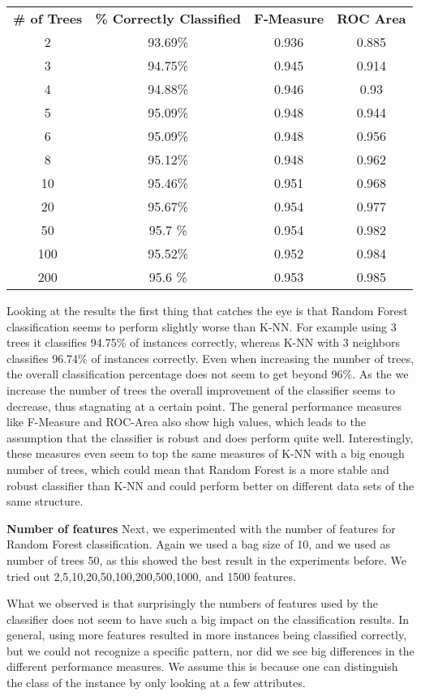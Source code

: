 \documentclass{sig-alternate-05-2015}
\begin{document}
{\begin{center}
\begin{tabular}{ c | c | c | c}
\textbf{\# of Trees} & \textbf{\% Correctly Classified} & \textbf{F-Measure} & \textbf{ROC Area}\\
2   & 93.69\% & 0.936 & 0.885\\
3   & 94.75\% & 0.945 & 0.914\\
4   & 94.88\% & 0.946 & 0.93\\
5   & 95.09\% & 0.948 & 0.944\\
6   & 95.09\% & 0.948 & 0.956\\
8   & 95.12\% & 0.948 & 0.962\\
10  & 95.46\% & 0.951 & 0.968\\
20  & 95.67\% & 0.954 & 0.977\\
50  & 95.7 \% & 0.954 & 0.982\\
100 & 95.52\% & 0.952 & 0.984\\
200 & 95.6 \% & 0.953 & 0.985\\
\end{tabular}
\end{center}

Looking at the results the first thing that catches the eye is that Random Forest classification seems to perform slightly worse than K-NN. For example using 3 trees it classifies 94.75\% of instances correctly, whereas K-NN with 3 neighbors classifies 96.74\% of instances correctly. Even when increasing the number of trees, the overall classification percentage does not seem to get beyond 96\%. As the we increase the number of trees the overall improvement of the classifier seems to decrease, thus stagnating at a certain point. The general performance measures like F-Measure and ROC-Area also show high values, which leads to the assumption that the classifier is robust and does perform quite well. Interestingly, these measures even seem to top the same measures of K-NN with a big enough number of trees, which could mean that Random Forest is a more stable and robust classifier than K-NN and could perform better on different data sets of the same structure.

\textbf{Number of features}
Next, we experimented with the number of features for Random Forest classification. Again we used a bag size of 10, and we used as number of trees 50, as this showed the best result in the experiments before. We tried out 2,5,10,20,50,100,200,500,1000, and 1500 features.

What we observed is that surprisingly the numbers of features used by the classifier does not seem to have such a big impact on the classification results. In general, using more features resulted in more instances being classified correctly, but we could not recognize a specific pattern, nor did we see big differences in the different performance measures. We assume this is because one can distinguish the class of the instance by only looking at a few attributes.

}
\end{document}
